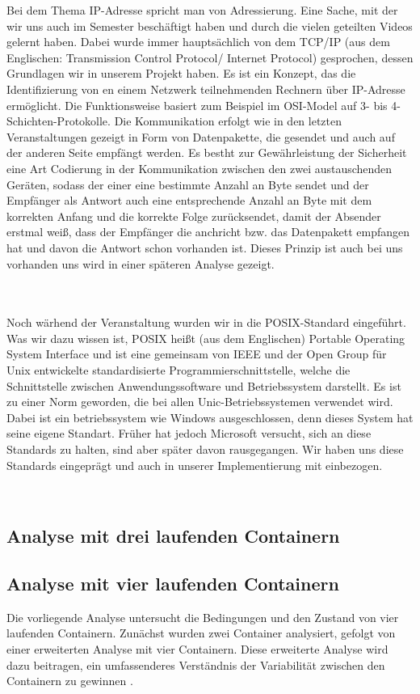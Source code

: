 {Bei dem Thema IP-Adresse spricht man von Adressierung. Eine Sache, mit der wir uns auch im Semester beschäftigt haben und durch die vielen geteilten Videos gelernt haben. Dabei wurde immer hauptsächlich von dem TCP/IP (aus dem Englischen: Transmission Control Protocol/ Internet Protocol) gesprochen, dessen Grundlagen wir in unserem Projekt haben. Es ist ein Konzept, das die Identifizierung von en einem Netzwerk teilnehmenden Rechnern über IP-Adresse ermöglicht. Die Funktionsweise basiert zum Beispiel im OSI-Model auf 3- bis 4-Schichten-Protokolle. Die Kommunikation erfolgt wie in den letzten Veranstaltungen gezeigt in Form von Datenpakette, die gesendet und auch auf der anderen Seite empfängt werden. Es bestht zur Gewährleistung der Sicherheit eine Art Codierung in der Kommunikation zwischen den zwei austauschenden Geräten, sodass der einer eine bestimmte Anzahl an Byte sendet und der Empfänger als Antwort auch eine entsprechende Anzahl an Byte mit dem korrekten Anfang und die korrekte Folge zurücksendet, damit der Absender erstmal weiß, dass der Empfänger die anchricht bzw. das Datenpakett empfangen hat und davon die Antwort schon vorhanden ist. Dieses Prinzip ist auch bei uns vorhanden uns wird in einer späteren Analyse gezeigt.

\\
\\

Noch wärhend der Veranstaltung wurden wir in die POSIX-Standard eingeführt. Was wir dazu wissen ist, POSIX heißt (aus dem Englischen) Portable Operating System Interface und ist eine gemeinsam von IEEE und der Open Group für Unix entwickelte standardisierte Programmierschnittstelle, welche die Schnittstelle zwischen Anwendungssoftware und Betriebssystem darstellt. Es ist zu einer Norm geworden, die bei allen Unic-Betriebssystemen verwendet wird. Dabei ist ein betriebssystem wie Windows ausgeschlossen, denn dieses System hat seine eigene Standart. Früher hat jedoch Microsoft versucht, sich an diese Standards zu halten, sind aber später davon rausgegangen. Wir haben uns diese Standards eingeprägt und auch in unserer Implementierung mit einbezogen.

\\




\subsection{Analyse mit drei laufenden Containern}

\subsection{Analyse mit vier laufenden Containern}
Die vorliegende Analyse untersucht die Bedingungen und den Zustand von vier laufenden Containern. Zunächst wurden zwei Container analysiert, gefolgt von einer erweiterten Analyse mit
vier Containern. Diese erweiterte Analyse wird dazu beitragen, ein umfassenderes Verständnis der Variabilität zwischen den Containern zu gewinnen .

}
